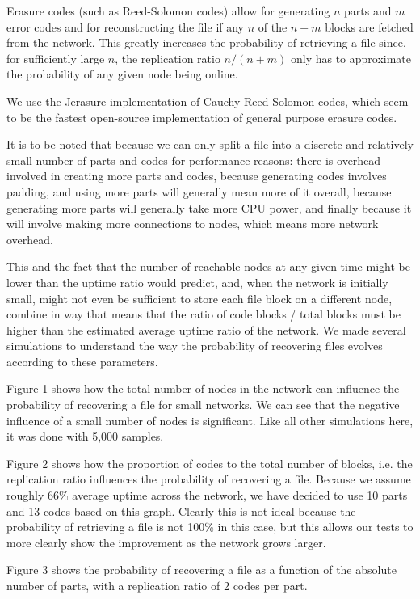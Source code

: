 \documentclass[11pt]{IEEEtran}
\begin{document}
Erasure codes (such as Reed-Solomon codes) allow for generating $n$ parts and $m$ error codes and for reconstructing the file if any $n$ of the $n + m$ blocks are fetched from the network. This greatly increases the probability of retrieving a file since, for sufficiently large $n$, the replication ratio $n/(n+m)$ only has to approximate the probability of any given node being online. 

We use the Jerasure implementation of Cauchy Reed-Solomon codes, which seem to be the fastest open-source implementation of general purpose erasure codes\cite{comparison_reed_solomon}. 

It is to be noted that because we can only split a file into a discrete and relatively small number of parts and codes for performance reasons: there is overhead involved in creating more parts and codes, because generating codes involves padding, and using more parts will generally mean more of it overall, because generating more parts will generally take more CPU power, and finally because it will involve making more connections to nodes, which means more network overhead.

This and the fact that the number of reachable nodes at any given time might be lower than the uptime ratio would predict, and, when the network is initially small, might not even be sufficient to store each file block on a different node, combine in way that means that the ratio of code blocks / total blocks must be higher than the estimated average uptime ratio of the network. We made several simulations to understand the way the probability of recovering files evolves according to these parameters.

Figure 1 shows how the total number of nodes in the network can influence the probability of recovering a file for small networks. We can see that the negative influence of a small number of nodes is significant. Like all other simulations here, it was done with 5,000 samples. 

Figure 2 shows how the proportion of codes to the total number of blocks, i.e. the replication ratio influences the probability of recovering a file. Because we assume roughly 66\% average uptime across the network, we have decided to use 10 parts and 13 codes based on this graph. Clearly this is not ideal because the probability of retrieving a file is not 100\% in this case, but this allows our tests to more clearly show the improvement as the network grows larger.

Figure 3 shows the probability of recovering a file as a function of the absolute number of parts, with a replication ratio of 2 codes per part.
\end{document}
